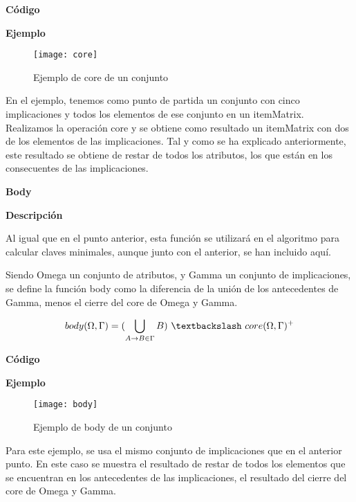     \bigskip


    \textbf{C\'odigo}

    
    \clearpage

    \textbf{Ejemplo}


    \begin{figure}[H]
        \centering
        \texttt{[image: core]}
        \caption{Ejemplo de core de un conjunto}
        \label{fig:core}
    \end{figure}

    En el ejemplo, tenemos como punto de partida un conjunto con cinco implicaciones y todos los elementos de ese conjunto en 
    un itemMatrix. Realizamos la operaci\'on core y se obtiene como resultado un itemMatrix con dos de los elementos de las implicaciones. 
    Tal y como se ha explicado anteriormente, este resultado se obtiene de restar de todos los atributos, los que est\'an en los consecuentes 
    de las implicaciones.
    \\

    \bigskip

\textbf{ \large Body}

\smallskip

    \textbf{Descripci\'on}

    Al igual que en el punto anterior, esta funci\'on se utilizar\'a en el algoritmo para calcular claves minimales, aunque junto con 
    el anterior, se han incluido aqu\'i.

    Siendo Omega un conjunto de atributos, y Gamma un conjunto de implicaciones, se define la funci\'on body como la diferencia 
    de la uni\'on de los antecedentes de Gamma, menos el cierre del core de Omega y Gamma. 

    \[
        body(\Omega , \Gamma ) = ( \bigcup_{A \to B \in \Gamma} B ) ~ \textbackslash ~ core(\Omega , \Gamma )^+
    \]

    \textbf{C\'odigo}

    
    \bigskip

    \textbf{Ejemplo}


    \begin{figure}[H]
        \centering
        \texttt{[image: body]}
        \caption{Ejemplo de body de un conjunto}
        \label{fig:body}
    \end{figure}

    Para este ejemplo, se usa el mismo conjunto de implicaciones que en el anterior punto. En este caso se muestra el 
    resultado de restar de todos los elementos que se encuentran en los antecedentes de las implicaciones, 
    el resultado del cierre del core de Omega y Gamma.

    \newpage
    \thispagestyle{empty}
    \mbox{}
    \newpage